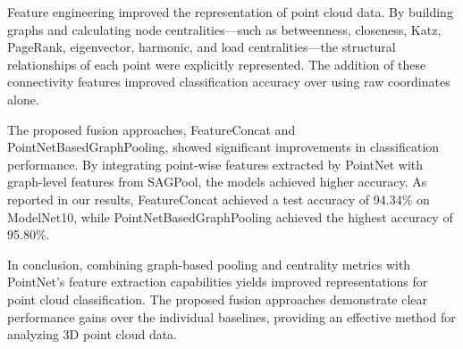\documentclass[conference]{IEEEtran}
\begin{document}
Feature engineering improved the representation of point cloud data. By building graphs and calculating node centralities—such as betweenness, closeness, Katz, PageRank, eigenvector, harmonic, and load centralities—the structural relationships of each point were explicitly represented. The addition of these connectivity features improved classification accuracy over using raw coordinates alone.

The proposed fusion approaches, FeatureConcat and PointNetBasedGraphPooling, showed significant improvements in classification performance. By integrating point-wise features extracted by PointNet with graph-level features from SAGPool, the models achieved higher accuracy. As reported in our results, FeatureConcat achieved a test accuracy of 94.34\% on ModelNet10, while PointNetBasedGraphPooling achieved the highest accuracy of 95.80\%.

In conclusion, combining graph-based pooling and centrality metrics with PointNet's feature extraction capabilities yields improved representations for point cloud classification. The proposed fusion approaches demonstrate clear performance gains over the individual baselines, providing an effective method for analyzing 3D point cloud data.
\end{document}
